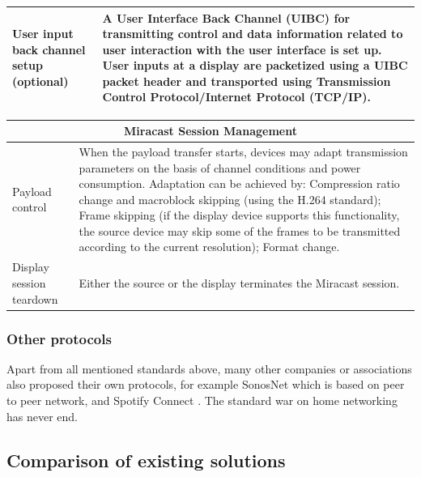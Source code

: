 \begin{center}
\begin{tabular}{ | p{3.5cm} | p{10cm} |}
    User input back channel setup (optional) & A User Interface Back Channel
    (UIBC) for transmitting control and data information related to user
    interaction with the user interface is set up. User inputs at a display are
    packetized using a UIBC packet header and transported using Transmission
    Control Protocol/Internet Protocol (TCP/IP).\\ \hline
    \end{tabular}
\end{center}

\begin{center}
    \begin{tabular}{ | p{3.5cm} | p{10cm} |}
     \hline
    \multicolumn{2}{c}{Miracast Session Management}\\
    \hline
    Payload control & When the payload transfer starts, devices may adapt
    transmission parameters on the basis of channel conditions and power
    consumption. Adaptation can be achieved by: Compression ratio change and
    macroblock skipping (using the H.264 standard); Frame skipping (if the
    display device supports this functionality, the source device may skip some
    of the frames to be transmitted according to the current resolution);
    Format change. \\ \hline
    
    Display session teardown  & Either the source or the display terminates the
    Miracast session. \\ \hline
    \end{tabular}
\end{center}

\subsubsection{Other protocols}
Apart from all mentioned standards above, many other companies or associations
also proposed their own protocols, for example SonosNet \cite{sonosnet} which is
based on peer to peer network, and Spotify Connect \cite{spotifyconnect}. The
standard war on home networking has never end.

\subsection{Comparison of existing solutions}
